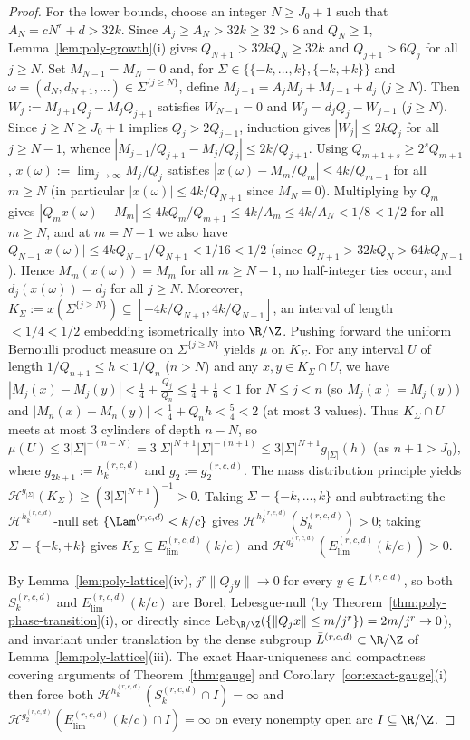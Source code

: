 \begin{proof}
For the lower bounds, choose an integer $N\ge J_0+1$ such that
$A_N=cN^r+d>32k$. Since $A_j\ge A_N>32k\ge32>6$ and $Q_N\ge1$, Lemma~\ref{lem:poly-growth}(i)
gives $Q_{N+1}>32kQ_N\ge32k$ and $Q_{j+1}>6Q_j$ for all $j\ge N$. Set
$M_{N-1}=M_N=0$ and, for $\Sigma\in\{\{-k,\dots,k\},\{-k,+k\}\}$ and
$\omega=(d_N,d_{N+1},\dots)\in\Sigma^{\{j\ge N\}}$, define $M_{j+1}=A_jM_j+M_{j-1}+d_j$
($j\ge N$). Then $W_j:=M_{j+1}Q_j-M_jQ_{j+1}$ satisfies $W_{N-1}=0$ and
$W_j=d_jQ_j-W_{j-1}$ ($j\ge N$). Since $j\ge N\ge J_0+1$ implies $Q_j>2Q_{j-1}$,
induction gives $|W_j|\le2kQ_j$ for all $j\ge N-1$, whence
$|M_{j+1}/Q_{j+1}-M_j/Q_j|\le2k/Q_{j+1}$. Using $Q_{m+1+s}\ge2^sQ_{m+1}$,
$x(\omega):=\lim_{j\to\infty}M_j/Q_j$ satisfies $|x(\omega)-M_m/Q_m|\le4k/Q_{m+1}$
for all $m\ge N$ (in particular $|x(\omega)|\le4k/Q_{N+1}$ since $M_N=0$).
Multiplying by $Q_m$ gives $|Q_mx(\omega)-M_m|\le4kQ_m/Q_{m+1}\le4k/A_m\le4k/A_N<1/8<1/2$
for all $m\ge N$, and at $m=N-1$ we also have $Q_{N-1}|x(\omega)|\le4kQ_{N-1}/Q_{N+1}<1/16<1/2$
(since $Q_{N+1}>32kQ_N>64kQ_{N-1}$). Hence $M_m(x(\omega))=M_m$ for all $m\ge N-1$,
no half-integer ties occur, and $d_j(x(\omega))=d_j$ for all $j\ge N$. Moreover,
$K_\Sigma:=x(\Sigma^{\{j\ge N\}})\subseteq[-4k/Q_{N+1},4k/Q_{N+1}]$, an interval
of length $<1/4<1/2$ embedding isometrically into $\R/\Z$. Pushing forward the
uniform Bernoulli product measure on $\Sigma^{\{j\ge N\}}$ yields $\mu$ on $K_\Sigma$.
For any interval $U$ of length $1/Q_{n+1}\le h<1/Q_n$ ($n>N$) and any $x,y\in K_\Sigma\cap U$,
we have $|M_j(x)-M_j(y)|<\frac14+\frac{Q_j}{Q_n}\le\frac14+\frac16<1$ for $N\le j<n$
(so $M_j(x)=M_j(y)$) and $|M_n(x)-M_n(y)|<\frac14+Q_nh<\frac54<2$ (at most $3$ values).
Thus $K_\Sigma\cap U$ meets at most $3$ cylinders of depth $n-N$, so
$\mu(U)\le3|\Sigma|^{-(n-N)}=3|\Sigma|^{N+1}|\Sigma|^{-(n+1)}\le3|\Sigma|^{N+1}g_{|\Sigma|}(h)$
(as $n+1>J_0$), where $g_{2k+1}:=h_k^{(r,c,d)}$ and $g_2:=g_2^{(r,c,d)}$. The
mass distribution principle yields $\mathcal H^{g_{|\Sigma|}}(K_\Sigma)\ge(3|\Sigma|^{N+1})^{-1}>0$.
Taking $\Sigma=\{-k,\dots,k\}$ and subtracting the $\mathcal H^{h_k^{(r,c,d)}}$-null
set $\{\Lam^{(r,c,d)}<k/c\}$ gives $\mathcal H^{h_k^{(r,c,d)}}(S_k^{(r,c,d)})>0$;
taking $\Sigma=\{-k,+k\}$ gives $K_\Sigma\subseteq E_{\mathrm{lim}}^{(r,c,d)}(k/c)$
and $\mathcal H^{g_2^{(r,c,d)}}(E_{\mathrm{lim}}^{(r,c,d)}(k/c))>0$.

By Lemma~\ref{lem:poly-lattice}(iv), $j^r\|Q_jy\|\to0$ for every $y\in L^{(r,c,d)}$,
so both $S_k^{(r,c,d)}$ and $E_{\mathrm{lim}}^{(r,c,d)}(k/c)$ are Borel,
Lebesgue-null (by Theorem~\ref{thm:poly-phase-transition}(i), or directly since
$\operatorname{Leb}_{\R/\Z}(\{\|Q_jx\|\le m/j^r\})=2m/j^r\to0$), and invariant
under translation by the dense subgroup $\bar L^{(r,c,d)}\subset\R/\Z$ of
Lemma~\ref{lem:poly-lattice}(iii). The exact Haar-uniqueness and compactness
covering arguments of Theorem~\ref{thm:gauge} and Corollary~\ref{cor:exact-gauge}(i)
then force both $\mathcal H^{h_k^{(r,c,d)}}(S_k^{(r,c,d)}\cap I)=\infty$ and
$\mathcal H^{g_2^{(r,c,d)}}(E_{\mathrm{lim}}^{(r,c,d)}(k/c)\cap I)=\infty$ on
every nonempty open arc $I\subseteq\R/\Z$.


\end{proof}
